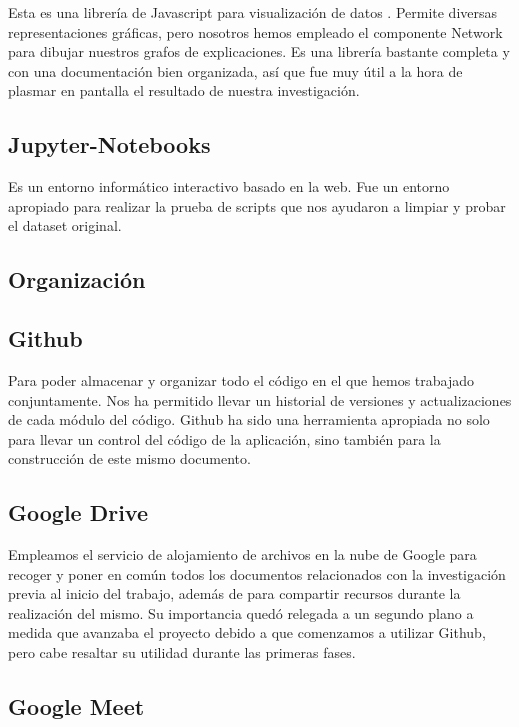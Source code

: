 Esta es una librería de Javascript para visualización de datos  \cite{visjs}. Permite diversas representaciones gráficas, pero nosotros hemos empleado el componente Network para dibujar nuestros grafos de explicaciones. Es una librería bastante completa y con una documentación bien organizada, así que fue muy útil a la hora de plasmar en pantalla el resultado de nuestra investigación.

\subsection*{Jupyter-Notebooks}

Es un entorno informático interactivo basado en la web. Fue un entorno apropiado para realizar la prueba de scripts que nos ayudaron a limpiar y probar el dataset original.

\subsection{Organización}

\subsection*{Github}

Para poder almacenar y organizar todo el código en el que hemos trabajado conjuntamente. Nos ha permitido llevar un historial de versiones y actualizaciones de cada módulo del código. Github ha sido una herramienta apropiada no solo para llevar un control del código de la aplicación, sino también para la construcción de este mismo documento.

\subsection*{Google Drive}

Empleamos el servicio de alojamiento de archivos en la nube de Google para recoger y poner en común todos los documentos relacionados con la investigación previa al inicio del trabajo, además de para compartir recursos durante la realización del mismo. Su importancia quedó relegada a un segundo plano a medida que avanzaba el proyecto debido a que comenzamos a utilizar Github, pero cabe resaltar su utilidad durante las primeras fases.

\subsection*{Google Meet}

